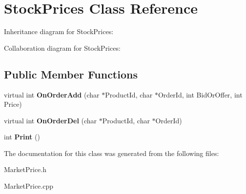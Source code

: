 \hypertarget{classStockPrices}{}\section{Stock\+Prices Class Reference}
\label{classStockPrices}


Inheritance diagram for Stock\+Prices\+:


Collaboration diagram for Stock\+Prices\+:
\subsection*{Public Member Functions}
\begin{DoxyCompactItemize}
\item 
virtual int {\bfseries On\+Order\+Add} (char $\ast$Product\+Id, char $\ast$Order\+Id, int Bid\+Or\+Offer, int Price)\hypertarget{classStockPrices_a744e83bbb1f4fea5f153683df79e32fd}{}\label{classStockPrices_a744e83bbb1f4fea5f153683df79e32fd}

\item 
virtual int {\bfseries On\+Order\+Del} (char $\ast$Product\+Id, char $\ast$Order\+Id)\hypertarget{classStockPrices_a39bd4ea5cfbcc186b61dbd1caef11ec3}{}\label{classStockPrices_a39bd4ea5cfbcc186b61dbd1caef11ec3}

\item 
int {\bfseries Print} ()\hypertarget{classStockPrices_a7f5b995652f8437eaa61c34d04260a09}{}\label{classStockPrices_a7f5b995652f8437eaa61c34d04260a09}

\end{DoxyCompactItemize}


The documentation for this class was generated from the following files\+:\begin{DoxyCompactItemize}
\item 
Market\+Price.\+h\item 
Market\+Price.\+cpp\end{DoxyCompactItemize}
